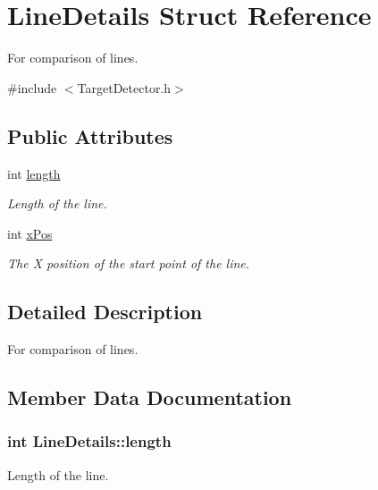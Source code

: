 \hypertarget{structLineDetails}{}\section{Line\+Details Struct Reference}
\label{structLineDetails}


For comparison of lines.  




{\ttfamily \#include $<$Target\+Detector.\+h$>$}

\subsection*{Public Attributes}
\begin{DoxyCompactItemize}
\item 
int \hyperlink{structLineDetails_a97769212b550adc56ddb4526f46e99e8}{length}
\begin{DoxyCompactList}\small\item\em Length of the line. \end{DoxyCompactList}\item 
int \hyperlink{structLineDetails_acc411b6f69225d2b26c003f23a8e9a83}{x\+Pos}
\begin{DoxyCompactList}\small\item\em The X position of the start point of the line. \end{DoxyCompactList}\end{DoxyCompactItemize}


\subsection{Detailed Description}
For comparison of lines. 

\subsection{Member Data Documentation}
\hypertarget{structLineDetails_a97769212b550adc56ddb4526f46e99e8}{}
\subsubsection[{length}]{\setlength{\rightskip}{0pt plus 5cm}int Line\+Details\+::length}\label{structLineDetails_a97769212b550adc56ddb4526f46e99e8}


Length of the line. 

